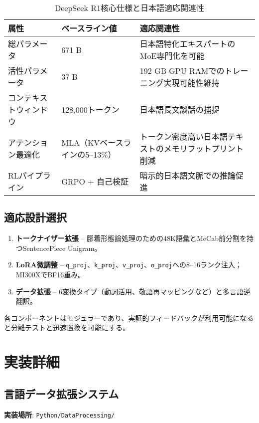 \documentclass[12pt,a4paper]{article}
\begin{document}
\begin{table}[h]
\centering
\begin{tabular}{@{}lll@{}}
\toprule
\textbf{属性} & \textbf{ベースライン値} & \textbf{適応関連性} \\
\midrule
総パラメータ & 671 B & 日本語特化エキスパートのMoE専門化を可能 \\
活性パラメータ & 37 B & 192 GB GPU RAMでのトレーニング実現可能性維持 \\
コンテキストウィンドウ & 128,000トークン & 日本語長文談話の捕捉 \\
アテンション最適化 & MLA（KVベースラインの5–13\%） & トークン密度高い日本語テキストのメモリフットプリント削減 \\
RLパイプライン & GRPO + 自己検証 & 暗示的日本語文脈での推論促進 \\
\bottomrule
\end{tabular}
\caption{DeepSeek R1核心仕様と日本語適応関連性}
\label{tab:deepseek_specs}
\end{table}

\subsection{適応設計選択}

\begin{enumerate}
\item \textbf{トークナイザー拡張} – 膠着形態論処理のための48K語彙とMeCab前分割を持つSentencePiece Unigram。
\item \textbf{LoRA微調整} – \texttt{q\_proj}、\texttt{k\_proj}、\texttt{v\_proj}、\texttt{o\_proj}への8–16ランク注入；MI300XでBF16重み。
\item \textbf{データ拡張} – 6変換タイプ（動詞活用、敬語再マッピングなど）と多言語逆翻訳。
\end{enumerate}

各コンポーネントはモジュラーであり、実証的フィードバックが利用可能になると分離テストと迅速置換を可能にする。

\section{実装詳細}

\subsection{言語データ拡張システム}

\textbf{実装場所}: \texttt{Python/DataProcessing/}
\end{document}

